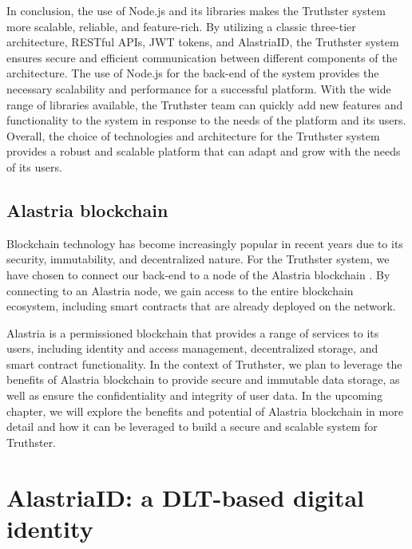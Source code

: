 \documentclass[target=mst,aauheader=]{thud}
\begin{document}
In conclusion, the use of Node.js and its libraries makes the Truthster system more scalable, reliable, and feature-rich. By utilizing a classic three-tier architecture, RESTful APIs, JWT tokens, and AlastriaID, the Truthster system ensures secure and efficient communication between different components of the architecture. The use of Node.js for the back-end of the system provides the necessary scalability and performance for a successful platform. With the wide range of libraries available, the Truthster team can quickly add new features and functionality to the system in response to the needs of the platform and its users. Overall, the choice of technologies and architecture for the Truthster system provides a robust and scalable platform that can adapt and grow with the needs of its users.

\section{Alastria blockchain}

Blockchain technology has become increasingly popular in recent years due to its security, immutability, and decentralized nature. For the Truthster system, we have chosen to connect our back-end to a node of the Alastria blockchain \cite{alastriaBlockchain}. By connecting to an Alastria node, we gain access to the entire blockchain ecosystem, including smart contracts that are already deployed on the network.\par
Alastria is a permissioned blockchain that provides a range of services to its users, including identity and access management, decentralized storage, and smart contract functionality. In the context of Truthster, we plan to leverage the benefits of Alastria blockchain to provide secure and immutable data storage, as well as ensure the confidentiality and integrity of user data. In the upcoming  chapter, we will explore the benefits and potential of Alastria blockchain in more detail and how it can be leveraged to build a secure and scalable system for Truthster.




\chapter{AlastriaID: a DLT-based digital identity}
\label{chapter:alastriaID}
\end{document}
